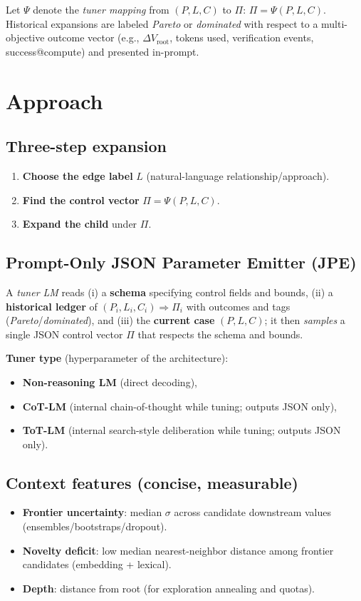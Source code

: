 \documentclass[11pt]{article}
\begin{document}
\noindent Let $\Psi$ denote the \emph{tuner mapping} from $(P,L,C)$ to $\Pi$: \quad $\Pi=\Psi(P,L,C)$. Historical expansions are labeled \emph{Pareto} or \emph{dominated} with respect to a multi-objective outcome vector (e.g., $\Delta V_{\text{root}}$, tokens used, verification events, success@compute) and presented in-prompt.

\section{Approach}
\subsection{Three-step expansion}
\begin{enumerate}[leftmargin=1.2em]
  \item \textbf{Choose the edge label} $L$ (natural-language relationship/approach).
  \item \textbf{Find the control vector} $\Pi = \Psi(P,L,C)$.
  \item \textbf{Expand the child} under $\Pi$.
\end{enumerate}

\subsection{Prompt-Only JSON Parameter Emitter (JPE)}
A \emph{tuner LM} reads (i) a \textbf{schema} specifying control fields and bounds, (ii) a \textbf{historical ledger} of $(P_i,L_i,C_i)\Rightarrow \Pi_i$ with outcomes and tags (\emph{Pareto}/\emph{dominated}), and (iii) the \textbf{current case} $(P,L,C)$; it then \emph{samples} a single JSON control vector $\Pi$ that respects the schema and bounds.

\medskip
\noindent\textbf{Tuner type} (hyperparameter of the architecture):
\begin{itemize}[leftmargin=1.2em,topsep=1pt,itemsep=1pt]
  \item \textbf{Non-reasoning LM} (direct decoding),
  \item \textbf{CoT-LM} (internal chain-of-thought while tuning; outputs JSON only),
  \item \textbf{ToT-LM} (internal search-style deliberation while tuning; outputs JSON only).
\end{itemize}

\subsection{Context features (concise, measurable)}
\begin{itemize}[leftmargin=1.2em]
  \item \textbf{Frontier uncertainty}: median $\sigma$ across candidate downstream values (ensembles/bootstraps/dropout).
  \item \textbf{Novelty deficit}: low median nearest-neighbor distance among frontier candidates (embedding + lexical).
  \item \textbf{Depth}: distance from root (for exploration annealing and quotas).
\end{itemize}
\end{document}
